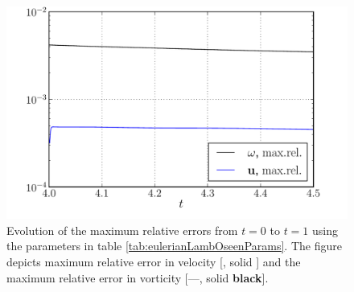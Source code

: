 	\begin{figure}[p]
	\centering
	\includegraphics[width=0.6\linewidth]{./figures/eulerian/lambOseen_eulerian_wRelEvolution_compressed.pdf}
	\caption{Evolution of the maximum relative errors from $t=0$ to $t=1$ using the parameters in table \ref{tab:eulerianLambOseenParams}. The figure depicts maximum relative error in velocity [{\color{plotBlue}{---}}, solid {}] and the maximum relative error in vorticity [---, solid \textbf{black}]. }
	\label{fig:lambOseen_eulerian_wRelEvolution}
	\end{figure}


